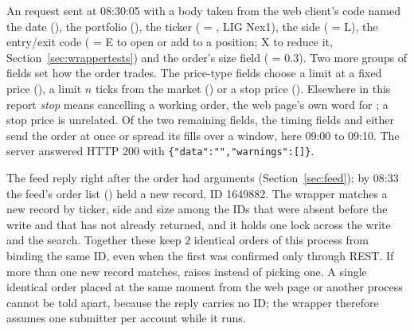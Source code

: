\seclabel
{}

 An  request sent at 08:30:05 with a body taken from the web client's code named the date (), the portfolio (), the ticker ( = , LIG Nex1), the side ( = L), the entry/exit code ( = E to open or add to a position; X to reduce it, Section~\ref{sec:wrappertests}) and the order's size field ( = 0.3). Two more groups of fields set how the order trades. The price-type fields choose a limit at a fixed price (), a limit $n$ ticks from the market () or a stop price (). Elsewhere in this report \emph{stop} means cancelling a working order, the web page's own word for ; a stop price is unrelated. Of the two remaining fields, the timing fields  and  either send the order at once or spread its fills over a window, here 09:00 to 09:10. The server answered HTTP 200 with \texttt{\{"data":"","warnings":[]\}}.

 The feed reply right after the order had  arguments (Section~\ref{sec:feed}); by 08:33 the feed's order list () held a new record, ID 1649882. The wrapper matches a new record by ticker, side and size among the IDs that were absent before the write and that  has not already returned, and it holds one lock across the write and the search. Together these keep 2 identical orders of this process from binding the same ID, even when the first was confirmed only through REST. If more than one new record matches,  raises  instead of picking one. A single identical order placed at the same moment from the web page or another process cannot be told apart, because the reply carries no ID; the wrapper therefore assumes one submitter per account while it runs.

